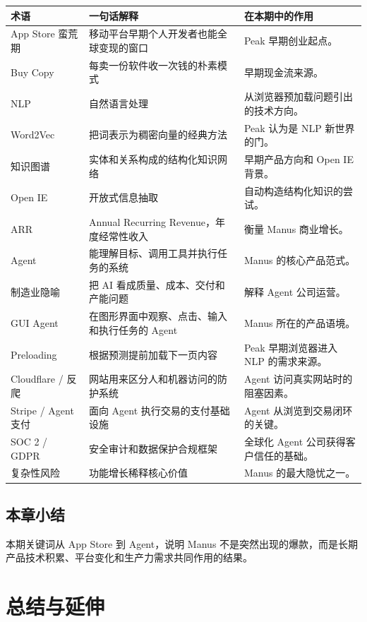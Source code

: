 \documentclass[a4paper]{article}
\begin{document}
\begin{longtable}{p{}p{}p{}}
\toprule
术语 & 一句话解释 & 在本期中的作用 \\
\midrule
App Store 蛮荒期 & 移动平台早期个人开发者也能全球变现的窗口 & Peak 早期创业起点。 \\
Buy Copy & 每卖一份软件收一次钱的朴素模式 & 早期现金流来源。 \\
NLP & 自然语言处理 & 从浏览器预加载问题引出的技术方向。 \\
Word2Vec & 把词表示为稠密向量的经典方法 & Peak 认为是 NLP 新世界的门。 \\
知识图谱 & 实体和关系构成的结构化知识网络 & 早期产品方向和 Open IE 背景。 \\
Open IE & 开放式信息抽取 & 自动构造结构化知识的尝试。 \\
ARR & Annual Recurring Revenue，年度经常性收入 & 衡量 Manus 商业增长。 \\
Agent & 能理解目标、调用工具并执行任务的系统 & Manus 的核心产品范式。 \\
制造业隐喻 & 把 AI 看成质量、成本、交付和产能问题 & 解释 Agent 公司运营。 \\
GUI Agent & 在图形界面中观察、点击、输入和执行任务的 Agent & Manus 所在的产品语境。 \\
Preloading & 根据预测提前加载下一页内容 & Peak 早期浏览器进入 NLP 的需求来源。 \\
Cloudflare / 反爬 & 网站用来区分人和机器访问的防护系统 & Agent 访问真实网站时的阻塞因素。 \\
Stripe / Agent 支付 & 面向 Agent 执行交易的支付基础设施 & Agent 从浏览到交易闭环的关键。 \\
SOC 2 / GDPR & 安全审计和数据保护合规框架 & 全球化 Agent 公司获得客户信任的基础。 \\
复杂性风险 & 功能增长稀释核心价值 & Manus 的最大隐忧之一。 \\
\bottomrule
\end{longtable}

\subsection{本章小结}

本期关键词从 App Store 到 Agent，说明 Manus 不是突然出现的爆款，而是长期产品技术积累、平台变化和生产力需求共同作用的结果。

\section{总结与延伸}
\end{document}
